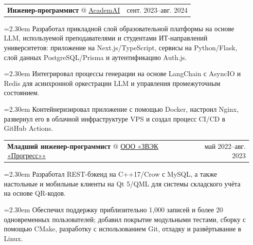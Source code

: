 \documentclass[11pt,a4paper]{article}
\makeatletter
\newcommand{\cvrow}[2]{%
  \noindent
  \begin{minipage}[t]{0.145\textwidth}
    \vspace{0pt}%
    \raggedright
    \fontsize{10.5}{12.5}\selectfont
    #1
  \end{minipage}%
  \hfill
  \begin{minipage}[t]{0.835\textwidth}
    \vspace{0pt}%
    #2
  \end{minipage}\par
}
\newcommand{\workentry}[2]{%
  \noindent
  \begin{tabularx}{\linewidth}
    {@{}X@{\hspace{0.8em}}r@{}}
    #1 & \small #2
  \end{tabularx}\par
  \vspace{0.15em}
}
\newcommand{\workproject}[1]{%
  \noindent
  \hangindent=2.30em
  \hangafter=1
  \hspace*{1.15em}\makebox[1.15em][l]{$\diamond$}#1\par
  \vspace{0.12em}
}
\makeatother
\begin{document}
\cvrow{}{%
  \workentry
    {\textbf{Инженер-программист} @ \href{https://academai.ru/}{AcademAI}}
    {сент. 2023--авг. 2024}
  \workproject{Разработал прикладной слой образовательной платформы на основе
  LLM, используемой преподавателями и студентами ИТ-направлений университетов:
  приложение на Next.js/TypeScript, сервисы на Python/Flask, слой данных
  PostgreSQL/Prisma и аутентификацию Auth.js.}
  \workproject{Интегрировал процессы генерации на основе LangChain с AsyncIO
  и Redis для асинхронной оркестрации LLM и управления промежуточным состоянием.}
  \workproject{Контейнеризировал приложение с помощью Docker, настроил Nginx,
  развернул его в облачной инфраструктуре VPS и создал процесс CI/CD
  в GitHub Actions.}
}

\cvrow{}{%
  \workentry
    {\textbf{Младший инженер-программист} @
    \href{https://zvekprogress.ru/}{ООО «ЗВЭК «Прогресс»»}}
    {май 2022--авг. 2023}

  \workproject{Разработал REST-бэкенд на C++17/Crow с MySQL, а также настольные
  и мобильные клиенты на Qt 5/QML для системы складского учёта на основе QR-кодов.}

  \workproject{Обеспечил поддержку приблизительно 1,000 записей и более
  20 одновременных пользователей; добавил покрытие модульными тестами, сборку
  с помощью CMake, разработку с использованием Git, отладку и развёртывание в Linux.}
}
\vspace{0.75em}
\end{document}
